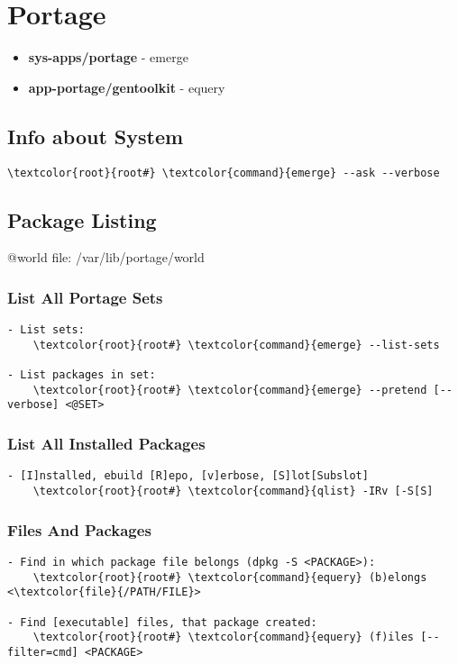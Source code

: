 \documentclass[10pt, a4paper, onecolumn, openany]{book}         %
\begin{document}
\chapter{Portage}%
\begin{itemize}
    \item \textbf{sys-apps/portage} - emerge
    \item \textbf{app-portage/gentoolkit} - equery
\end{itemize}
\section{Info about System}
\begin{Verbatim}[commandchars=\\\{\}]
    \textcolor{root}{root#} \textcolor{command}{emerge} --ask --verbose
\end{Verbatim}

\section{Package Listing}
@world file: \textcolor{file}{/var/lib/portage/world}
\subsection{List All Portage Sets}
\begin{Verbatim}[commandchars=\\\{\}]
- List sets:
    \textcolor{root}{root#} \textcolor{command}{emerge} --list-sets
    
- List packages in set:
    \textcolor{root}{root#} \textcolor{command}{emerge} --pretend [--verbose] <@SET>
\end{Verbatim}

\subsection{List All Installed Packages}
\begin{Verbatim}[commandchars=\\\{\}]
- [I]nstalled, ebuild [R]epo, [v]erbose, [S]lot[Subslot]
    \textcolor{root}{root#} \textcolor{command}{qlist} -IRv [-S[S]
\end{Verbatim}

\subsection{Files And Packages}
\begin{Verbatim}[commandchars=\\\{\}]
- Find in which package file belongs (dpkg -S <PACKAGE>):
    \textcolor{root}{root#} \textcolor{command}{equery} (b)elongs <\textcolor{file}{/PATH/FILE}>
    
- Find [executable] files, that package created:
    \textcolor{root}{root#} \textcolor{command}{equery} (f)iles [--filter=cmd] <PACKAGE>
\end{Verbatim}
\end{document}
